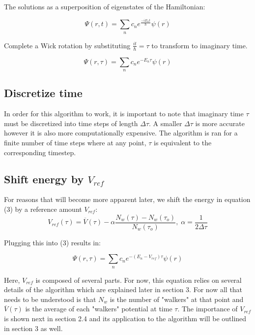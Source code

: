 \documentclass{article}
\begin{document}
The solutions as a superposition of eigenstates of the Hamiltonian:

\begin{equation} \label{eqn}
\Psi(r,t)=\sum_{n}c_{n}e^{\frac{{-i}E_{n}t}{\hbar}}\psi(r)
\end{equation}

Complete a Wick rotation by substituting $\frac{it}{\hbar}=\tau$ to transform to imaginary time.

\begin{equation} \label{eqn}
\Psi(r,\tau)=\sum_{n}c_{n}e^{-E_{n}\tau}\psi(r)
\end{equation}
\subsection{Discretize time}
In order for this algorithm to work, it is important to note that imaginary time $\tau$ must be discretized into time steps of length $\Delta\tau$. 
A smaller $\Delta\tau$ is more accurate however it is also more computationally expensive. 
The algorithm is ran for a finite number of time steps where at any point, $\tau$ is equivalent to the corresponding timestep.

\subsection{Shift energy by $V_{ref}$}
For reasons that will become more apparent later, we shift the energy in equation (3) by  a reference amount $V_{ref}$:
\begin{equation} \label{eqn}
V_{ref}(\tau)=\overline{V}(\tau)-\alpha\frac{N_{w}(\tau)-N_{w}(\tau_{o})}{N_{w}(\tau_{o})},\;\alpha=\frac{1}{2\Delta\tau}
\end{equation}

Plugging this into (3) results in:

\begin{equation} \label{eqn}
\Psi(r,\tau)=\sum_{n}c_{n}e^{-(E_{n}-V_{ref})\tau}\psi(r)
\end{equation}

Here, $V_{ref}$ is composed of several parts. 
For now, this equation relies on several details of the algorithm which are explained later in section 3. 
For now all that needs to be understood is that $N_{w}$ is the number of "walkers" at that point and $\overline{V}(\tau)$ is the average of each "walkers" potential at time $\tau$. 
The importance of $V_{ref}$ is shown next in section 2.4 and its application to the algorithm will be outlined in section 3 as well. 
\end{document}
